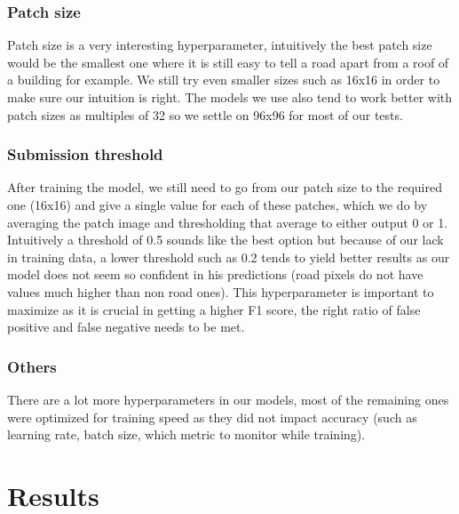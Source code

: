 \documentclass[10pt,conference,compsocconf]{IEEEtran}
\begin{document}
\subsubsection{Patch size}
Patch size is a very interesting hyperparameter, intuitively the best patch size would be the smallest one where it is still easy to tell a road apart from a roof of a building for example. We still try even smaller sizes such as 16x16 in order to make sure our intuition is right. The models we use also tend to work better with patch sizes as multiples of 32 so we settle on 96x96 for most of our tests.
\subsubsection{Submission threshold}
After training the model, we still need to go from our patch size to the required one (16x16) and give a single value for each of these patches, which we do by averaging the patch image and thresholding that average to either output 0 or 1. Intuitively a threshold of 0.5 sounds like the best option but because of our lack in training data, a lower threshold such as 0.2 tends to yield better results as our model does not seem so confident in his predictions (road pixels do not have values much higher than non road ones). This hyperparameter is important to maximize as it is crucial in getting a higher F1 score, the right ratio of false positive and false negative needs to be met.
\subsubsection{Others}
There are a lot more hyperparameters in our models, most of the remaining ones were optimized for training speed as they did not impact accuracy (such as learning rate, batch size, which metric to monitor while training).
\section{Results}
\end{document}
